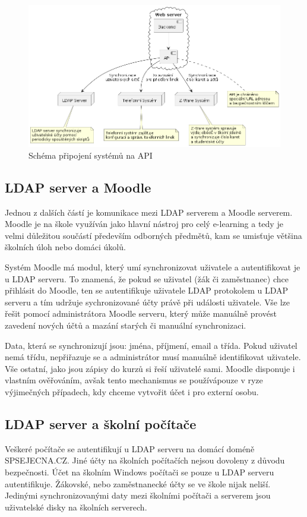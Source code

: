 \documentclass[FM,Proj]{tulthesis}
\begin{document}
\begin{figure}[H]
    \includegraphics[width=\textwidth-28pt]{backend-api.png}
    \caption{Schéma připojení systémů na API}
    \label{fig:backend-api}
\end{figure}

\subsection*{LDAP server a Moodle}
Jednou z dalších částí je komunikace mezi LDAP serverem a Moodle serverem. Moodle je na škole
využíván jako hlavní nástroj pro celý e-learning a tedy je velmi důležitou součástí především
odborných předmětů, kam se umisťuje většina školních úloh nebo domáci úkolů.

Systém Moodle má modul, který umí synchronizovat uživatele a autentifikovat je u LDAP serveru.
To znamená, že pokud se uživatel (žák či zaměstnanec) chce přihlásit do Moodle, ten se 
autentifikuje uživatele LDAP protokolem u LDAP serveru a tím udržuje sychronizované účty právě
při události uživatele.
Vše lze řešit pomocí administrátora Moodle serveru, který může manuálně provést zavedení 
nových účtů a mazání starých či manuální synchronizaci.

Data, která se synchronizují jsou: jména, příjmení, email a třída. Pokud uživatel nemá třídu,
nepřiřazuje se a administrátor musí manuálně identifikovat uživatele. Vše ostatní, jako jsou 
zápisy do kurzů si řeší uživatelé sami. Moodle disponuje i vlastním ověřováním, avšak tento
mechanismus se používápouze  v ryze výjimečných případech, kdy chceme vytvořit účet i pro 
externí osobu.

\subsection*{LDAP server a školní počítače}
Veškeré počítače se autentifikují u LDAP serveru na domácí doméně SPSEJECNA.CZ. Jiné účty
na školních počítačích nejsou dovoleny z důvodu bezpečnosti.
Účet na školním Windows počítači se pouze u LDAP serveru autentifikuje. Žákovské, nebo
zaměstnanecké účty se ve škole nijak neliší. Jedinými synchronizovanými daty mezi školními
počítači a serverem jsou uživatelské disky na školních serverech.
\end{document}
